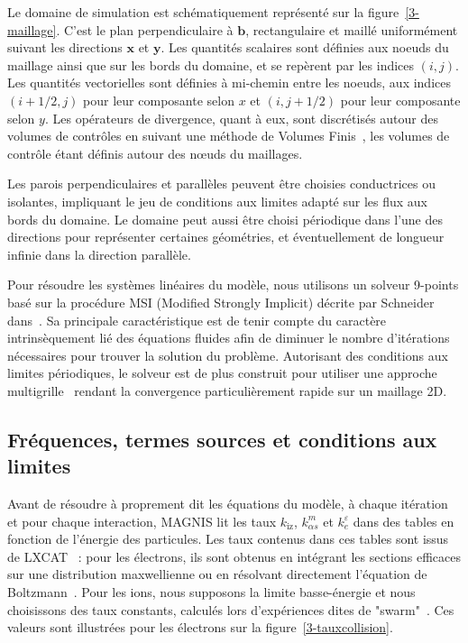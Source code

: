 \begin{refsection}
Le domaine de simulation est schématiquement représenté sur la figure~\ref{3-maillage}.
C'est le plan perpendiculaire à $\mathbf{b}$, rectangulaire et maillé uniformément suivant
les directions $\mathbf{x}$ et $\mathbf{y}$. Les quantités
scalaires sont définies aux noeuds du maillage ainsi que sur les bords du
domaine, et se repèrent par les indices $(i,j)$. Les quantités vectorielles
sont définies à mi-chemin entre les noeuds, aux indices $(i+1/2,j)$ pour leur
composante selon $x$ et $(i,j+1/2)$ pour leur composante selon $y$.
Les opérateurs
de divergence, quant à eux, sont discrétisés autour des volumes de contrôles en
suivant une méthode de Volumes Finis~\parencite{toro}, les volumes de
contrôle étant définis autour des n\oe uds du maillages. 

Les parois perpendiculaires et parallèles peuvent être choisies conductrices ou
isolantes, impliquant le jeu de conditions aux limites adapté sur les flux
aux bords du domaine. Le domaine peut aussi être choisi périodique dans l'une
des directions pour représenter certaines géométries, et éventuellement
de longueur infinie dans la direction parallèle.
 
Pour résoudre les systèmes linéaires du modèle, nous utilisons un solveur
9-points basé sur la procédure
MSI (Modified Strongly Implicit) décrite par Schneider
dans~\parencite{Schneider}. Sa principale caractéristique est de tenir
compte du caractère intrinsèquement lié des équations fluides afin de diminuer
le nombre d'itérations nécessaires pour trouver la solution du problème. Autorisant des
conditions aux limites périodiques, le solveur est de plus construit pour
utiliser une approche multigrille~\parencite{Fedorenko} rendant la convergence
particulièrement rapide sur un maillage 2D.

\subsection{Fréquences, termes sources et conditions aux limites}
Avant de résoudre à proprement dit les équations du modèle, à chaque
itération et pour chaque interaction, MAGNIS lit les taux $k_\text{iz}$,
$k^m_{\alpha s}$ et $k^\varepsilon_{e}$ dans des tables en fonction
de l'énergie des particules. 
Les taux contenus dans ces tables
sont issus de LXCAT~\parencite{LXCAT} : pour les électrons, ils
sont obtenus en intégrant les sections efficaces sur une distribution
maxwellienne ou en résolvant directement l'équation de
Boltzmann~\parencite{Bolsig}. Pour les ions, nous supposons la limite
basse-énergie et nous choisissons des taux constants, calculés lors
d'expériences dites de "swarm"~\parencite{Ellis}.
Ces valeurs sont illustrées pour les électrons sur la
figure~\ref{3-tauxcollision}.


\end{refsection}

